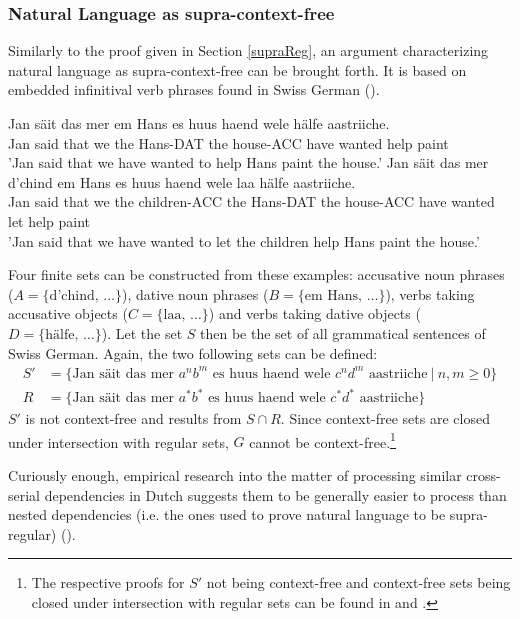 \subsubsection{Natural Language as supra-context-free}\label{supraCF}
Similarly to the proof given in Section \ref{supraReg}, an argument characterizing natural language as supra-context-free can be brought forth. It is based on embedded infinitival verb phrases found in Swiss German (\cite{Shieber1987}).
\begin{exe}
	\ex
	\gll Jan säit das mer em Hans es huus haend wele hälfe aastriiche. \\
	Jan said that we the Hans-DAT the house-ACC have wanted help paint \\
	\trans 'Jan said that we have wanted to help Hans paint the house.'
	\ex
	\gll Jan säit das mer d'chind em Hans es huus haend wele laa hälfe aastriiche. \\
	Jan said that we the children-ACC the Hans-DAT the house-ACC have wanted let help paint \\
	\trans 'Jan said that we have wanted to let the children help Hans paint the house.'
\end{exe}
Four finite sets can be constructed from these examples: accusative noun phrases ($A = \lbrace \text{d'chind}, \, \dots \rbrace$), dative noun phrases ($B = \lbrace \text{em Hans}, \, \dots \rbrace$), verbs taking accusative objects ($C = \lbrace \text{laa}, \, \dots \rbrace$) and verbs taking dative objects ($D = \lbrace \text{hälfe}, \, \dots \rbrace$). Let the set $S$ then be the set of all grammatical sentences of Swiss German. Again, the two following sets can be defined:
\begin{align*}
S' &= \lbrace \text{Jan säit das mer } a^{n}b^{m} \text{ es huus haend wele } c^{n}d^{m} \text{ aastriiche} \: \vert \: n, m \geq 0 \rbrace \\
R &= \lbrace \text{Jan säit das mer } a^{*}b^{*} \text{ es huus haend wele } c^{*}d^{*} \text{ aastriiche} \rbrace
\end{align*}
$S'$ is not context-free and results from $S \cap R$. Since context-free sets are closed under intersection with regular sets, $G$ cannot be context-free.\footnote{The respective proofs for $S'$ not being context-free and context-free sets being closed under intersection with regular sets can be found in \cite{Hopcroft2006} and \cite{Sipser2013}.}

Curiously enough, empirical research into the matter of processing similar cross-serial dependencies in Dutch suggests them to be generally easier to process than nested dependencies (i.e. the ones used to prove natural language to be supra-regular) (\cite{Bach1986}).

